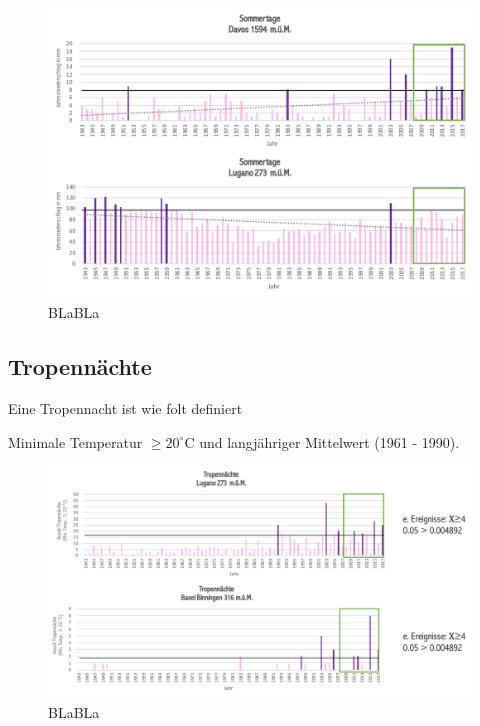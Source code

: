 \begin{refsection}
\begin{figure}[htbp]
\centering
\includegraphics[width=1.0\textwidth]{extrem/Sommertage.pdf}
\caption{BLaBLa}
\label{Sommertage}
\end{figure}



\subsection{Tropennächte}
Eine Tropennacht ist wie folt definiert

\begin{definition}
Minimale Temperatur $\ge 20^{\circ}$C und langjähriger Mittelwert (1961 - 1990).
\end{definition}

\begin{figure}[htbp]
\centering
\includegraphics[width=1.0\textwidth]{extrem/Tropennacht.pdf}
\caption{BLaBLa}
\label{Tropennacht}
\end{figure}



\end{refsection}
